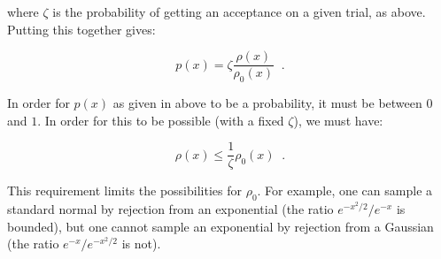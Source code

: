 where $\zeta$ is the probability of getting an acceptance on a given trial, as above. Putting this together gives:

\begin{equation}
p(x) = \zeta \frac{\rho(x)}{\rho_0(x)} \;\; .
\end{equation}

In order for $p(x)$ as given in above to be a probability, it must be between $0$ and $1$.  In order for this to be possible (with a fixed $\zeta$), we must have:

\begin{displaymath}
\rho(x) \leq \frac{1}{\zeta} \rho_0(x) \;\; .
\end{displaymath}

This requirement limits the possibilities for $\rho_0$.  For example, one can sample a standard normal by rejection from an exponential (the ratio $e^{-x^2/2}/e^{-x}$ is bounded), but one cannot sample an exponential by rejection from a Gaussian (the ratio $e^{-x}/e^{-x^2/2}$ is not).
